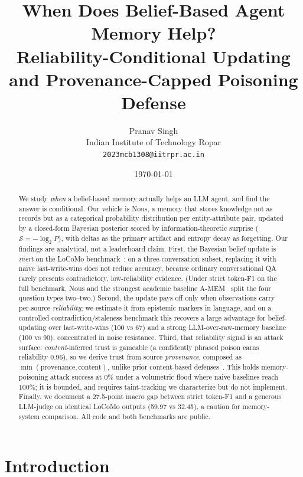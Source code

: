 \documentclass[11pt,a4paper,twocolumn]{article}
\title{\large\textbf{When Does Belief-Based Agent Memory Help?\\
Reliability-Conditional Updating and Provenance-Capped Poisoning Defense}}
\author{
  Pranav Singh \\
  Indian Institute of Technology Ropar \\
  \texttt{2023mcb1308@iitrpr.ac.in}
}
\date{\today}
\begin{document}
\maketitle
\thispagestyle{empty}

\begin{abstract}
We study \emph{when} a belief-based memory actually helps an LLM agent, and find
the answer is conditional. Our vehicle is Nous, a memory that stores knowledge
not as records but as a categorical probability distribution per
entity-attribute pair, updated by a closed-form Bayesian posterior scored by
information-theoretic surprise ($\mathcal{S}=-\log_2 P$), with deltas as the
primary artifact and entropy decay as forgetting. Our findings are analytical,
not a leaderboard claim. First, the Bayesian belief update is \emph{inert} on the
LoCoMo benchmark~\citep{maharana2024locomo}: on a three-conversation subset,
replacing it with naive last-write-wins does not reduce accuracy, because ordinary
conversational QA rarely presents contradictory, low-reliability evidence. (Under
strict token-F1 on the full benchmark, Nous and the strongest academic baseline
A-MEM~\citep{xu2025amem} split the four question types two--two.) Second, the update
pays off only when observations carry per-source \emph{reliability}; we estimate it
from epistemic markers in language, and on a controlled contradiction/staleness
benchmark this recovers a large advantage for belief-updating over last-write-wins
(100 vs 67) and a strong LLM-over-raw-memory baseline (100 vs 90), concentrated in
noise resistance. Third, that reliability signal is an attack surface:
\emph{content}-inferred trust is gameable (a confidently phrased poison earns
reliability $0.96$), so we derive trust from source \emph{provenance}, composed as
$\min(\text{provenance},\text{content})$, unlike prior content-based
defenses~\citep{mempoison2026}. This holds memory-poisoning attack success at $0\%$
under a volumetric flood where naive baselines reach $100\%$; it is bounded, and
requires taint-tracking we characterize but do not implement. Finally, we document
a 27.5-point macro gap between strict token-F1 and a generous LLM-judge on
identical LoCoMo outputs (59.97 vs 32.45), a caution for memory-system comparison.
All code and both benchmarks are public.
\end{abstract}

\section{Introduction}
\end{document}
